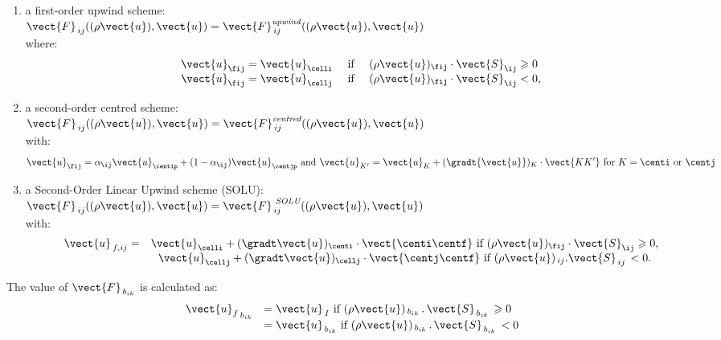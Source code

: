 \begin{enumerate}[ label=\roman{*}/, ref=(\roman{*})]
\item a  first-order upwind scheme:\\
 $\vect{F}_{\,ij}((\rho \vect{u}), \vect{u})=
\vect{F}^{\it{ upwind}}_{\,ij}((\rho \vect{u}),\vect{u})$\\
where:
\begin{equation}
\begin{array}{r c l}
\vect{u}_{\fij}=\vect{u}_{\celli} &\text{ if }&
(\rho \vect{u})_{\fij} \cdot \vect{S}_{\ij} \geqslant 0\\
\vect{u}_{\fij}=\vect{u}_{\cellj} &\text{ if }&
(\rho \vect{u})_{\fij} \cdot \vect{S}_{\ij}  < 0,\\
\end{array}
\end{equation}
%
\item a second-order centred scheme:\\
$\vect{F}_{\,ij}((\rho \vect{u}), \vect{u})=
\vect{F}^{\text{\it{centred}}}_{\,ij}((\rho\vect{u}),\vect{u})$\\
with:
\begin{equation}
\vect{u}_{\fij}=
\alpha_{\ij} \vect{u}_{\centip}+(1-\alpha_{\ij}) \vect{u}_{\centjp} \text{ and } \vect{u}_{K'} = \vect{u}_{K}+(\gradt{\vect{u}})_K \cdot \vect{KK'} \text{ for } K = \centi \text{ or } \centj
\end{equation}
%
\item a Second-Order Linear Upwind scheme (SOLU):\\
$\vect{F}_{\,ij}((\rho \vect{u}), \vect{u})=
\vect{F}^{\text{\it { SOLU}}}_{\,ij}((\rho \vect{u}),\vect{u})$ \\
with:
\begin{equation}
\begin{array}{r c l}
\vect{u}_{\,f,ij}= &
\vect{u}_{\celli} +  (\gradt\vect{u})_{\centi} \cdot \vect{\centi \centf} \text{ if } (\rho
\vect{u})_{\fij} \cdot \vect{S}_{\ij} \geqslant 0, \\
& \vect{u}_{\cellj} + (\gradt \vect{u})_{\cellj} \cdot \vect{\centj \centf} \text{ if } (\rho
\vect{u})_{\,ij}.\vect{S}_{\,ij}\,< 0.
\end{array}
\end{equation}
\end{enumerate}


The value of ${\vect{F}_{\,b_{ik}}}$ is calculated as:\\
\begin{equation}
\begin{array}{ll}
{\vect{u}_f}_{\,{b}_{ik}} &=\vect{u}_{\,I}
\ \text{if $(\rho \vect{u})_{\,{b}_{ik}}\,.\,\vect{S}_{\,{b}_{ik}}\,\geqslant 0$}\\
&={\vect{u}_{\,{b}_{ik}}}
\  \text{if $(\rho \vect{u})_{\,{b}_{ik}}\,.\, \vect{S}_{\,{b}_{ik}}\,< 0$}
\end{array}
\end{equation}


